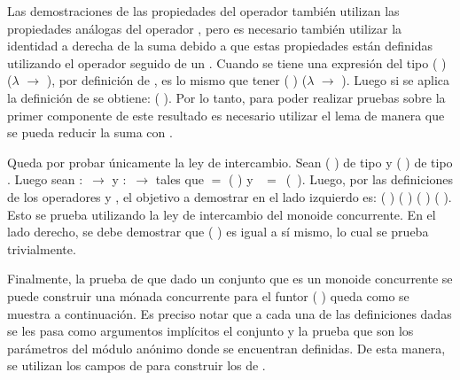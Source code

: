 \begin{AgdaAlign}
Las demostraciones de las propiedades del operador  también utilizan las propiedades análogas del operador , pero es necesario también utilizar la identidad a derecha de la suma debido a que estas propiedades están definidas utilizando el operador  seguido de un . Cuando se tiene una expresión del tipo  ( \AgdaInductiveConstructor{,} \AgdaBound{\_}) ($\lambda$ \AgdaBound{\_} $\rightarrow$  \AgdaBound{\_}), por definición de , es lo mismo que tener  ( \AgdaInductiveConstructor{,} \AgdaBound{\_}) ($\lambda$ \AgdaBound{\_} $\rightarrow$  \AgdaInductiveConstructor{,} \AgdaBound{\_}). Luego si se aplica la definición de  se obtiene: ( \AgdaField{+}  \AgdaInductiveConstructor{,} \AgdaBound{\_}). Por lo tanto, para poder realizar pruebas sobre la primer componente de este resultado es necesario utilizar el lema  de manera que se pueda reducir la suma con .


Queda por probar únicamente la ley de intercambio. Sean ( \AgdaInductiveConstructor{,} ) de tipo   y ( \AgdaInductiveConstructor{,} ) de tipo  . Luego sean  $:$  $\rightarrow$   y  $:$  $\rightarrow$   tales que  $=$ ( \AgdaInductiveConstructor{,} ) y \hbox{ $=$ ( \AgdaInductiveConstructor{,} )}. Luego, por las definiciones de los operadores  y , el objetivo a demostrar en el lado izquierdo es:  ( \AgdaField{+} ) ( \AgdaField{+} ) \AgdaField{$\lesssim$} ( ) \AgdaField{+} ( ). Esto se prueba utilizando la ley de intercambio del monoide concurrente. En el lado derecho, se debe demostrar que ( \AgdaInductiveConstructor{,} ) es igual a sí mismo, lo cual se prueba trivialmente. 

Finalmente, la prueba de que dado un conjunto  que es un monoide concurrente se puede construir una mónada concurrente para el funtor ( ) queda como se muestra a continuación. Es preciso notar que a cada una de las definiciones dadas se les pasa como argumentos implícitos el conjunto  y la prueba  que son los parámetros del módulo anónimo donde se encuentran definidas. De esta manera, se utilizan los campos de  para construir los de .
\end{AgdaAlign}

